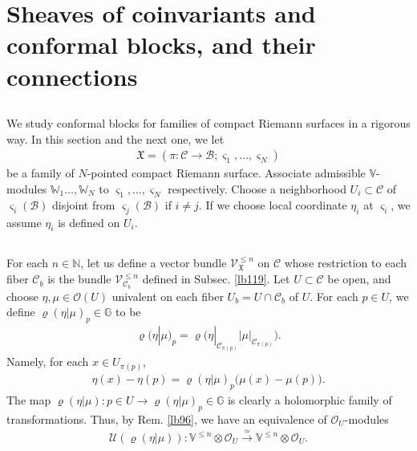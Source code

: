 \documentclass[12pt,a4paper,notitlepage]{article}
\theoremstyle{definition}
\theoremstyle{plain}
\newcommand{\fk}{\mathfrak}
\newcommand{\mc}{\mathcal}
\newcommand{\id}{\mathbf{1}}
\newcommand{\scr}{\mathscr}
\newcommand{\sgm}{\varsigma}
\newcommand{\Vbb}{\mathbb V}
\newcommand{\Wbb}{\mathbb W}
\newcommand{\Gbb}{\mathbb G}
\newcommand{\Nbb}{\mathbb N}
\numberwithin{equation}{section}
\begin{document}
\section{Sheaves of coinvariants and conformal blocks, and their connections}\label{lb136}



\subsection{}\label{lb127}

We study conformal blocks for families of compact Riemann surfaces in a rigorous way. In this section and the next one, we let
\begin{align*}
\fk X=(\pi:\mc C\rightarrow\mc B;\sgm_1,\dots,\sgm_N)
\end{align*}
be a family of $N$-pointed compact Riemann surface. Associate admissible $\Vbb$-modules $\Wbb_1\dots,\Wbb_N$ to $\sgm_1,\dots,\sgm_N$ respectively. Choose a  neighborhood $U_i\subset\mc C$ of $\sgm_i(\mc B)$ disjoint from $\sgm_j(\mc B)$ if $i\neq j$. If we choose local coordinate $\eta_i$ at $\sgm_i$, we assume $\eta_i$ is defined on $U_i$. 


\subsection{}

For each $n\in\Nbb$, let us define a vector bundle $\scr V^{\leq n}_{\fk X}$ on $\mc C$ whose restriction to each fiber $\mc C_b$ is the bundle $\scr V^{\leq n}_{\mc C_b}$ defined in Subsec. \ref{lb119}. Let $U\subset\mc C$ be open, and choose $\eta,\mu\in\scr O(U)$ univalent on each fiber $U_b=U\cap\mc C_b$ of $U$. For each $p\in U$, we define $\varrho(\eta|\mu)_p\in\Gbb$ to be
\begin{align}
\varrho(\eta|\mu)_p=\varrho\Big(\eta|_{\mc C_{\pi(p)}}\Big|\mu|_{\mc C_{\pi(p)}}\Big).
\end{align}
Namely, for each $x\in U_{\pi(p)}$, \index{zz@$\varrho(\alpha\lvert\id),\varrho(\eta\lvert\mu)$}
\begin{align}
\eta(x)-\eta(p)=\varrho(\eta|\mu)_p\big(\mu(x)-\mu(p)\big).
\end{align}
The map $\varrho(\eta|\mu):p\in U\rightarrow\varrho(\eta|\mu)_p\in\Gbb$ is clearly a holomorphic family of transformations. Thus, by Rem. \ref{lb96}, we have an equivalence of $\scr O_U$-modules
\begin{align}
\mc U(\varrho(\eta|\mu)):\Vbb^{\leq n}\otimes\scr O_U\xrightarrow{\simeq}\Vbb^{\leq n}\otimes\scr O_U.
\end{align}
\end{document}
